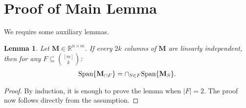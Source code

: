 \documentclass[9pt,twocolumn]{pnas-new}
\newtheorem{lemma}{Lemma}
\newtheorem{remark}{Remark}
\begin{document}



\showacknow %





\clearpage

\section{Proof of Main Lemma}

We require some auxiliary lemmas.

\begin{lemma}\label{SpanIntersectionLemma}
Let $\mathbf{M} \in \mathbb{R}^{n \times m}$. If every $2k$ columns of $\mathbf{M}$ are linearly independent, then for any $F \subseteq {[m] \choose k}$:
\begin{align*}
\text{\rm Span}\{\mathbf{M}_{\cap F}\}  = \cap_{S \in F} \text{\rm Span}\{\mathbf{M}_S\}.
\end{align*}
\end{lemma}
\begin{proof}
By induction, it is enough to prove the lemma when $|F| = 2$. The proof now follows directly from the assumption.
\end{proof}
\end{document}
